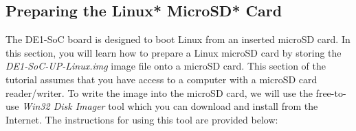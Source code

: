 \documentclass[11pt, twoside, pdftex]{article}
\begin{document}
\subsection{Preparing the Linux* MicroSD* Card}

The DE1-SoC board is designed to boot Linux from an inserted microSD card. In this section, 
you will learn how to prepare a Linux microSD card by storing the \textit{DE1-SoC-UP-Linux.img}
image file onto a microSD card. This section of the tutorial assumes that you have access to a 
computer with a microSD card reader/writer. To write the image into the microSD card, we will 
use the free-to-use \textit{Win32 Disk Imager} tool which you can download and install from 
the Internet. The instructions for using this tool are provided below:

\begin{enumerate}


\end{enumerate}
\end{document}
